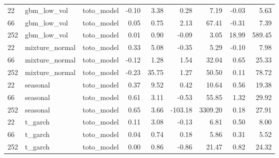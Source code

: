 {\begin{tabular}{lllrrrrrr}
\midrule
22 & gbm\_low\_vol & toto\_model & -0.10 & 3.38 & 0.28 & 7.19 & -0.03 & 5.63 \\
66 & gbm\_low\_vol & toto\_model & 0.05 & 0.75 & 2.13 & 67.41 & -0.31 & 7.39 \\
252 & gbm\_low\_vol & toto\_model & 0.01 & 0.90 & -0.09 & 3.05 & 18.99 & 589.45 \\
\midrule
22 & mixture\_normal & toto\_model & 0.33 & 5.08 & -0.35 & 5.29 & -0.10 & 7.98 \\
66 & mixture\_normal & toto\_model & -0.12 & 1.28 & 1.54 & 32.04 & 0.65 & 25.33 \\
252 & mixture\_normal & toto\_model & -0.23 & 35.75 & 1.27 & 50.50 & 0.11 & 78.72 \\
\midrule
22 & seasonal & toto\_model & 0.37 & 9.52 & 0.42 & 10.64 & 0.56 & 19.38 \\
66 & seasonal & toto\_model & 0.61 & 3.11 & -0.53 & 55.85 & 1.32 & 29.92 \\
252 & seasonal & toto\_model & 0.65 & 3.66 & -103.18 & 3309.20 & 0.18 & 27.91 \\
\midrule
22 & t\_garch & toto\_model & 0.11 & 3.08 & -0.13 & 6.81 & 0.50 & 8.00 \\
66 & t\_garch & toto\_model & 0.04 & 0.74 & 0.18 & 5.86 & 0.31 & 5.52 \\
252 & t\_garch & toto\_model & 0.00 & 0.86 & -0.86 & 21.47 & 0.82 & 24.32 \\
\bottomrule
\end{tabular}
}